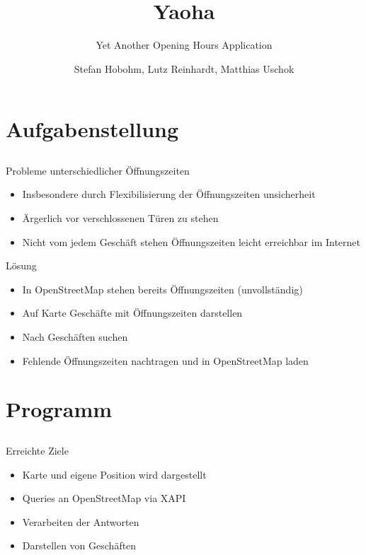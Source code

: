 \documentclass[hyperref]{beamer}
\title{Yaoha}
\subtitle{Yet Another Opening Hours Application}
\author[Hobohm, Reinhardt, Uschok]{Stefan Hobohm, Lutz Reinhardt, Matthias Uschok}
\institute[TU Braunschweig, IBR]{Technische Universität Braunschweig, IBR}
\begin{document}
\frame[plain]{\titlepage}


\section{Aufgabenstellung}
\subsection{}

\begin{frame}{Probleme unterschiedlicher Öffnungszeiten}
\begin{itemize}
\item Insbesondere durch Flexibilisierung der Öffnungszeiten unsicherheit
\item Ärgerlich vor verschlossenen Türen zu stehen
\item Nicht vom jedem Geschäft stehen Öffnungszeiten leicht erreichbar im Internet
\end{itemize}
\end{frame}

\begin{frame}{Lösung}
\begin{itemize}
\item In OpenStreetMap stehen bereits Öffnungszeiten (unvollständig)
\item Auf Karte Geschäfte mit Öffnungszeiten darstellen
\item Nach Geschäften suchen
\item Fehlende Öffnungszeiten nachtragen und in OpenStreetMap laden
\end{itemize}
\end{frame}

\section{Programm}
\subsection{}


\begin{frame}{Erreichte Ziele}
\begin{itemize}
\item Karte und eigene Position wird dargestellt
\item Queries an OpenStreetMap via XAPI
\item Verarbeiten der Antworten
\item Darstellen von Geschäften
\end{itemize}
\end{frame}
\end{document}
